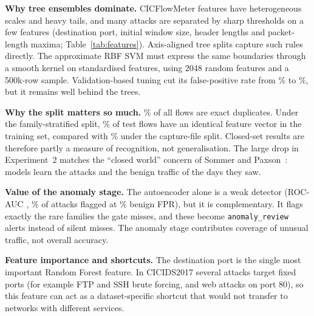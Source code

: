 \textbf{Why tree ensembles dominate.} CICFlowMeter features have heterogeneous scales and heavy tails, and many attacks are separated by sharp thresholds on a few features (destination port, initial window size, header lengths and packet-length maxima; Table~\ref{tab:features}). Axis-aligned tree splits capture such rules directly. The approximate RBF SVM must express the same boundaries through a smooth kernel on standardised features, using 2048 random features and a 500k-row sample. Validation-based tuning cut its false-positive rate from \SvmValFprBefore\% to \SvmValFprAfter\%, but it remains well behind the trees.

\textbf{Why the split matters so much.} \DupPct\% of all flows are exact duplicates. Under the family-stratified split, \EoneOverlap\% of test flows have an identical feature vector in the training set, compared with \EtwoOverlap\% under the capture-file split. Closed-set results are therefore partly a measure of recognition, not generalisation. The large drop in Experiment~2 matches the ``closed world'' concern of Sommer and Paxson~\cite{sommer2010outside}: models learn the attacks and the benign traffic of the days they saw.

\textbf{Value of the anomaly stage.} The autoencoder alone is a weak detector (ROC-AUC \EoneAeAuc, \EoneAeTpr\% of attacks flagged at \EoneAeFpr\% benign FPR), but it is complementary. It flags exactly the rare families the gate misses, and these become \texttt{anomaly\_review} alerts instead of silent misses. The anomaly stage contributes coverage of unusual traffic, not overall accuracy.

\textbf{Feature importance and shortcuts.} The destination port is the single most important Random Forest feature. In CICIDS2017 several attacks target fixed ports (for example FTP and SSH brute forcing, and web attacks on port 80), so this feature can act as a dataset-specific shortcut that would not transfer to networks with different services.

